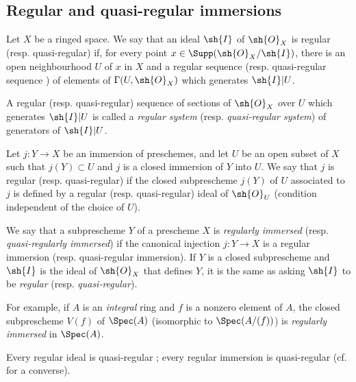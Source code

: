 \subsection{Regular and quasi-regular immersions}
\label{IV.16.9}

\begin{definition}[16.9.1]
\label{IV.16.9.1}
Let $X$ be a ringed space.
We say that an ideal $\sh{I}$ of $\sh{O}_X$ is regular (resp. quasi-regular) if, for every point $x \in \Supp(\sh{O}_X/\sh{I})$, there is an open neighbourhood $U$ of $x$ in $X$ and a regular sequence  (resp. quasi-regular sequence ) of elements of $\Gamma(U, \sh{O}_X)$ which generates $\sh{I}|U$.
\end{definition}

A regular (resp. quasi-regular) sequence of sections of $\sh{O}_X$ over $U$ which generates $\sh{I}|U$ is called a \emph{regular system} (resp. \emph{quasi-regular system}) of generators of $\sh{I}|U$.

\begin{definition}[16.9.2]
\label{IV.16.9.2}
Let $j: Y \to X$ be an immersion of preschemes, and let $U$ be an open subset of $X$ such that $j(Y) \subset U$ and $j$ is a closed immersion of $Y$ into $U$.
We say that $j$ is regular (resp. quasi-regular) if the closed subprescheme $j(Y)$ of $U$ associated to $j$ is defined by a regular (resp. quasi-regular) ideal of $\sh{O}_U$ (condition independent of the choice of $U$).
\end{definition}

We say that a subprescheme $Y$ of a prescheme $X$ is \emph{regularly immersed} (resp. \emph{quasi-regularly immersed}) if the canonical injection $j:Y \to X$ is a regular immersion (resp. quasi-regular immersion). 
If $Y$ is a closed subprescheme and $\sh{I}$ is the ideal of $\sh{O}_X$ that defines $Y$, it is the same as asking $\sh{I}$ to be \emph{regular} (resp. \emph{quasi-regular}).

For example, if $A$ is an \emph{integral} ring and $f$ is a nonzero element of $A$, the closed subprescheme $V(f)$ of $\Spec(A)$ (isomorphic to $\Spec(A/(f))$) is \emph{regularly immersed} in $\Spec(A)$.

Every regular ideal is quasi-regular ;
every regular immersion is quasi-regular (cf.  for a converse).  

